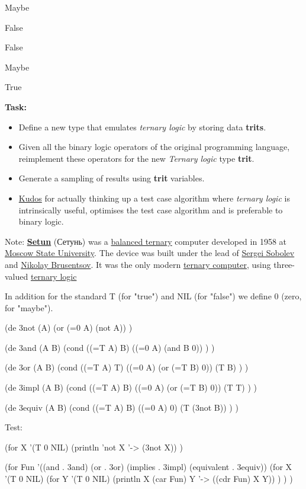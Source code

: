 Maybe

False

False

Maybe

True

\textbf{Task:}

\begin{itemize}
\item
  Define a new type that emulates \emph{ternary logic} by storing data
  \textbf{trits}.
\item
  Given all the binary logic operators of the original programming
  language, reimplement these operators for the new \emph{Ternary logic}
  type \textbf{trit}.
\item
  Generate a sampling of results using \textbf{trit} variables.
\item
  \href{http://en.wikipedia.org/wiki/Kudos}{Kudos} for actually thinking
  up a test case algorithm where \emph{ternary logic} is intrinsically
  useful, optimises the test case algorithm and is preferable to binary
  logic.
\end{itemize}

Note: \textbf{\href{http://en.wikipedia.org/wiki/Setun}{Setun}} (Сетунь)
was a \href{http://en.wikipedia.org/wiki/balanced\_ternary}{balanced
ternary} computer developed in 1958 at
\href{http://en.wikipedia.org/wiki/Moscow\_State\_University}{Moscow
State University}. The device was built under the lead of
\href{http://en.wikipedia.org/wiki/Sergei\_Sobolev}{Sergei Sobolev} and
\href{http://en.wikipedia.org/wiki/Nikolay\_Brusentsov}{Nikolay
Brusentsov}. It was the only modern
\href{http://en.wikipedia.org/wiki/ternary\_computer}{ternary computer},
using three-valued
\href{http://en.wikipedia.org/wiki/ternary\_logic}{ternary logic}



\begin{wideverbatim}

In addition for the standard T (for "true") and NIL (for "false") we define 0
(zero, for "maybe").

(de 3not (A)
   (or (=0 A) (not A)) )

(de 3and (A B)
   (cond
      ((=T A) B)
      ((=0 A) (and B 0)) ) )

(de 3or (A B)
   (cond
      ((=T A) T)
      ((=0 A) (or (=T B) 0))
      (T B) ) )

(de 3impl (A B)
   (cond
      ((=T A) B)
      ((=0 A) (or (=T B) 0))
      (T T) ) )

(de 3equiv (A B)
   (cond
      ((=T A) B)
      ((=0 A) 0)
      (T (3not B)) ) )

Test:

(for X '(T 0 NIL)
   (println 'not X '-> (3not X)) )

(for Fun '((and . 3and) (or . 3or) (implies . 3impl) (equivalent . 3equiv))
   (for X '(T 0 NIL)
      (for Y '(T 0 NIL)
         (println X (car Fun) Y '-> ((cdr Fun) X Y)) ) ) )


\end{wideverbatim}

